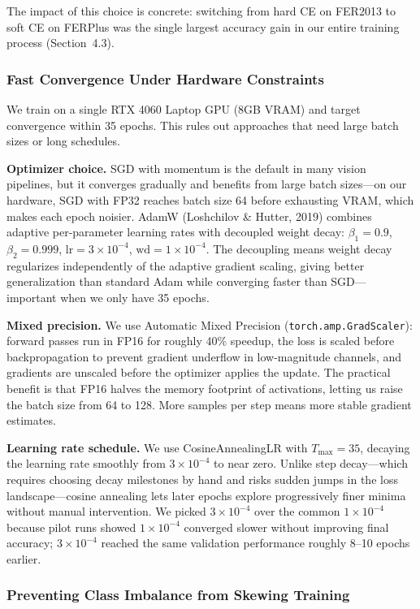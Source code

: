 \documentclass[12pt,a4paper]{article}
\begin{document}
The impact of this choice is concrete: switching from hard CE on FER2013 to soft CE on FERPlus was the single largest accuracy gain in our entire training process (Section~4.3).

\subsubsection{Fast Convergence Under Hardware Constraints}

We train on a single RTX 4060 Laptop GPU (8GB VRAM) and target convergence within 35 epochs. This rules out approaches that need large batch sizes or long schedules.

\textbf{Optimizer choice.} SGD with momentum is the default in many vision pipelines, but it converges gradually and benefits from large batch sizes---on our hardware, SGD with FP32 reaches batch size 64 before exhausting VRAM, which makes each epoch noisier. AdamW (Loshchilov \& Hutter, 2019) combines adaptive per-parameter learning rates with decoupled weight decay: $\beta_1=0.9$, $\beta_2=0.999$, $\text{lr}=3\times10^{-4}$, $\text{wd}=1\times10^{-4}$. The decoupling means weight decay regularizes independently of the adaptive gradient scaling, giving better generalization than standard Adam while converging faster than SGD---important when we only have 35 epochs.

\textbf{Mixed precision.} We use Automatic Mixed Precision (\texttt{torch.amp.GradScaler}): forward passes run in FP16 for roughly 40\% speedup, the loss is scaled before backpropagation to prevent gradient underflow in low-magnitude channels, and gradients are unscaled before the optimizer applies the update. The practical benefit is that FP16 halves the memory footprint of activations, letting us raise the batch size from 64 to 128. More samples per step means more stable gradient estimates.

\textbf{Learning rate schedule.} We use CosineAnnealingLR with $T_{\max}=35$, decaying the learning rate smoothly from $3\times10^{-4}$ to near zero. Unlike step decay---which requires choosing decay milestones by hand and risks sudden jumps in the loss landscape---cosine annealing lets later epochs explore progressively finer minima without manual intervention. We picked $3\times10^{-4}$ over the common $1\times10^{-4}$ because pilot runs showed $1\times10^{-4}$ converged slower without improving final accuracy; $3\times10^{-4}$ reached the same validation performance roughly 8--10 epochs earlier.

\subsubsection{Preventing Class Imbalance from Skewing Training}
\end{document}
